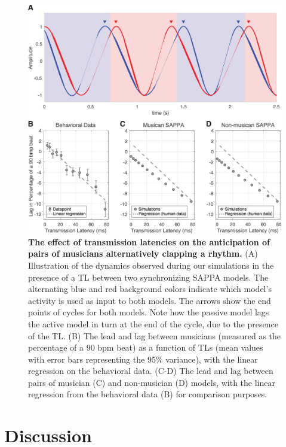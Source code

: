 \documentclass{report}
\begin{document}
\begin{figure}
    \centering
    \includegraphics[width=1.0\textwidth]{figures/fig2_4.png}
    \caption[The effect of transmission latencies on the anticipation of pairs of musicians alternatively clapping a rhythm]{\textbf{The effect of transmission latencies on the anticipation of pairs of musicians alternatively clapping a rhythm.} (A) Illustration of the dynamics observed during our simulations in the presence of a TL between two synchronizing SAPPA models. The alternating blue and red background colors indicate which model’s activity is used as input to both models. The arrows show the end points of cycles for both models. Note how the passive model lags the active model in turn at the end of the cycle, due to the presence of the TL. (B) The lead and lag between musicians (measured as the percentage of a 90 bpm beat) as a function of TLs (mean values with error bars representing the 95\% variance), with the linear regression on the behavioral data. (C-D) The lead and lag between pairs of musician (C) and non-musician (D) models, with the linear regression from the behavioral data (B) for comparison purposes.} 
    \label{f2_4}
\end{figure}

\section{Discussion}
\end{document}
